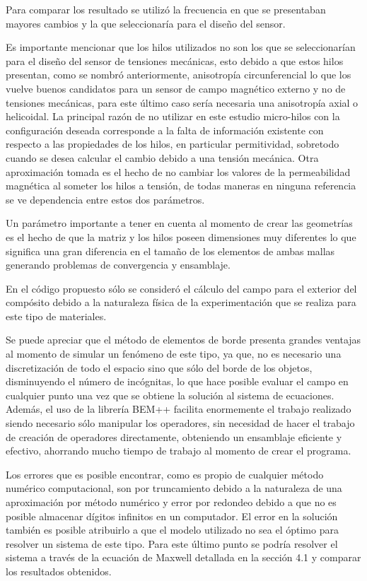 \documentclass[12pt,letterpaper]{article}
\numberwithin{equation}{section}
\begin{document}
Para comparar los resultado se utilizó la frecuencia en que se presentaban mayores cambios y la que seleccionaría para el diseño del sensor. 

Es importante mencionar que los hilos utilizados no son los que se seleccionarían para el diseño del sensor de tensiones mecánicas, esto debido a que estos hilos presentan, como se nombró anteriormente, anisotropía circunferencial lo que los vuelve buenos candidatos para un sensor de campo magnético externo y no de tensiones mecánicas, para este último caso sería necesaria una anisotropía axial o helicoidal. La principal razón de no utilizar en este estudio micro-hilos con la configuración deseada corresponde a la falta de información existente con respecto a las propiedades de los hilos, en particular permitividad, sobretodo cuando se desea calcular el cambio debido a una tensión mecánica. Otra aproximación tomada es el hecho de no cambiar los valores de la permeabilidad magnética al someter los hilos a tensión, de todas maneras en ninguna referencia se ve dependencia entre estos dos parámetros. 

Un parámetro importante a tener en cuenta al momento de crear las geometrías es el hecho de que la matriz y los hilos poseen dimensiones muy diferentes lo que significa una gran diferencia en el tamaño de los elementos de ambas mallas generando problemas de convergencia y ensamblaje. 

En el código propuesto sólo se consideró el cálculo del campo para el exterior del compósito debido a la naturaleza física de la experimentación que se realiza para este tipo de materiales.

Se puede apreciar que el método de elementos de borde presenta grandes ventajas al momento de simular un fenómeno de este tipo, ya que, no es necesario una discretización de todo el espacio sino que sólo del borde de los objetos, disminuyendo el número de incógnitas, lo que hace posible evaluar el campo en cualquier punto una vez que se obtiene la solución al sistema de ecuaciones. Además, el uso de la librería BEM++ facilita enormemente el trabajo realizado siendo necesario sólo manipular los operadores, sin necesidad de hacer el trabajo de creación de operadores directamente, obteniendo un ensamblaje eficiente y efectivo, ahorrando mucho tiempo de trabajo al momento de crear el programa.

Los errores que es posible encontrar, como es propio de cualquier método numérico computacional, son por truncamiento debido a la naturaleza de una aproximación por método numérico y error por redondeo debido a que no es posible almacenar dígitos infinitos en un computador. El error en la solución también es posible atribuirlo a que el modelo utilizado no sea el óptimo para resolver un sistema de este tipo. Para este último punto se podría resolver el sistema a través de la ecuación de Maxwell detallada en la sección 4.1 y comparar los resultados obtenidos.
\end{document}
